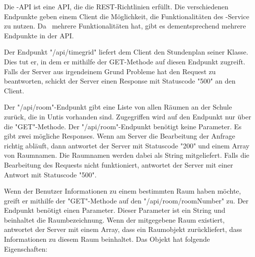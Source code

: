 \label{sec:zeliaapi}

Die \ZELIA-API ist eine API, die die REST-Richtlinien erfüllt. Die verschiedenen Endpunkte geben einem Client die Möglichkeit, die Funktionalitäten des \ZELIA-Service zu nutzen. Da \ZELIA\ mehrere Funktionalitäten hat, gibt es dementsprechend mehrere Endpunkte in der API. 

Der Endpunkt "/api/timegrid" liefert dem Client den Stundenplan seiner Klasse. Dies tut er, in dem er mithilfe der GET-Methode auf diesen Endpunkt zugreift. Falls der Server aus irgendeinem Grund Probleme hat den Request zu beantworten, schickt der Server einen Response mit Statuscode "500" an den Client.


Der "/api/room"-Endpunkt gibt eine Liste von allen Räumen an der Schule zurück, die in Untis vorhanden sind. Zugegriffen wird auf den Endpunkt nur über die "GET"-Methode. Der "/api/room"-Endpunkt benötigt keine Parameter. Es gibt zwei mögliche Responses. Wenn am Server die Bearbeitung der Anfrage richtig abläuft, dann antwortet der Server mit Statuscode "200" und einem Array von Raumnamen. Die Raumnamen werden dabei als String mitgeliefert. 
Falls die Bearbeitung des Requests nicht funktioniert, antwortet der Server mit einer Antwort mit Statuscode "500".


Wenn der Benutzer Informationen zu einem bestimmten Raum haben möchte, greift er mithilfe der "GET"-Methode auf den "/api/room/{roomNumber}" zu. Der Endpunkt benötigt einen Parameter. Dieser Parameter ist ein String und beinhaltet die Raumbezeichnung.  Wenn der mitgegebene Raum existiert, antwortet der Server mit einem Array, dass ein Raumobjekt zurückliefert, dass Informationen zu diesem Raum beinhaltet. Das Objekt hat folgende Eigenschaften:

